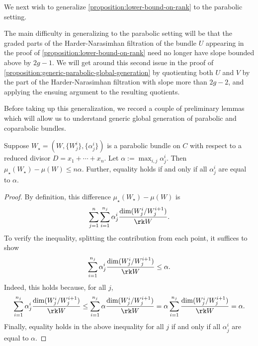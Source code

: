 We next wish to generalize \autoref{proposition:lower-bound-on-rank} to the parabolic setting.
\begin{remark}
\notready
	\label{remark:}
	The main difficulty in generalizing to the parabolic setting will be that
the graded parts of the Harder-Narasimhan filtration of the bundle
$U$ appearing in the proof of \autoref{proposition:lower-bound-on-rank} need no
longer have slope bounded above by $2g-1$.
We will get around this second issue in the proof of
\autoref{proposition:generic-parabolic-global-generation}
by quotienting both $U$ and $V$ by the
part of the Harder-Narasimhan filtration with slope more than $2g-2$, and
applying the ensuing argument to the resulting quotients.
\end{remark}

Before taking up this generalization, we record a couple of preliminary lemmas which will allow us to
understand generic global generation of
parabolic and coparabolic bundles.

\begin{lemma}
\notready
	\label{lemma:pushforward-degree}
Suppose $W_\star= (W,\{ W^i_j\}, \{\alpha^i_j\})$ is a parabolic bundle on $C$ with respect to a reduced divisor $D=x_1+\cdots+x_n$.
	Let $\alpha := \max_{i,j} \alpha^i_j$.
	Then
	$\mu_\star(W_\star) - \mu(W) \leq n\alpha$.
	Further, equality holds if and only if all $\alpha^i_j$ are equal to
	$\alpha$.
\end{lemma}
\begin{proof}
	By definition, this difference $\mu_\star(W_\star) - \mu(W)$ is
	$$\sum_{j=1}^n \sum_{i=1}^{n_j} \alpha^i_j \frac{\dim
	(W^i_j/W_j^{i+1})}{\rk W}.$$
	To verify the inequality, splitting the contribution from each point,
	it suffices to show
	$$\sum_{i=1}^{n_j} \alpha^i_j \frac{\dim
	(W^i_j/W_j^{i+1})}{\rk W} \leq \alpha.$$
	Indeed, this holds because, for all $j$,
	\begin{align*}
		\sum_{i=1}^{n_j} \alpha^i_j \frac{\dim
	(W^i_j/W_j^{i+1})}{\rk W} \leq \sum_{i=1}^{n_j} \alpha \frac{\dim
	(W^i_j/W_j^{i+1})}{\rk W} = \alpha \sum_{i=1}^{n_j}  \frac{\dim
	(W^i_j/W_j^{i+1})}{\rk W} = \alpha.
	\end{align*}
	Finally, equality holds in the above inequality for all $j$ if and only if all
	$\alpha^i_j$ are equal to $\alpha$.
\end{proof}

